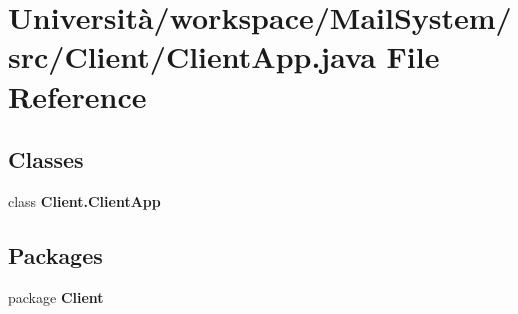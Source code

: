 \section{Università/workspace/\+Mail\+System/src/\+Client/\+Client\+App.java File Reference}
\label{_client_app_8java}
\subsection*{Classes}
\begin{DoxyCompactItemize}
\item 
class \textbf{ Client.\+Client\+App}
\end{DoxyCompactItemize}
\subsection*{Packages}
\begin{DoxyCompactItemize}
\item 
package \textbf{ Client}
\end{DoxyCompactItemize}
